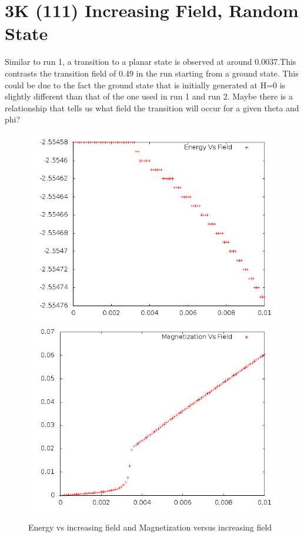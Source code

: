 \documentclass{article}
\begin{document}
\section{3K (111) Increasing Field, Random State}
Similar to run 1, a transition to a planar state is observed at around 0.0037.This contrasts the transition field of 
0.49 in the run starting from a ground state. This could be due to the fact the ground state that is initially 
generated at H=0 is slightly different than that of the one used in run 1 and run 2. Maybe there is a relationship
that tells us what field the transition will occur for a given theta and phi?
\begin{figure}[h]
 \centering 
\includegraphics[scale=0.3]{111_3000/E000to005R.png}
\includegraphics[scale=0.3]{111_3000/M000to005R.png}
\caption{Energy vs increasing field and Magnetization versus increasing field}
\end{figure}
\end{document}
